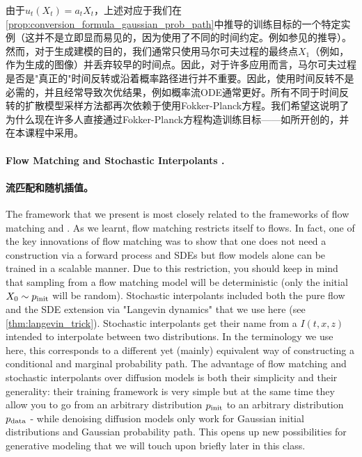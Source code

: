 由于$u_t(X_t)=a_tX_t$，上述对应于我们在\cref{prop:conversion_formula_gaussian_prob_path}中推导的训练目标的一个特定实例（这并不是立即显而易见的，因为使用了不同的时间约定。例如参见\citep{lipman2024flow}的推导）。然而，对于生成建模的目的，我们通常只使用马尔可夫过程的最终点$X_1$（例如，作为生成的图像）并丢弃较早的时间点。因此，对于许多应用而言，马尔可夫过程是否是"真正的"时间反转或沿着概率路径进行并不重要。因此，使用时间反转不是必需的，并且经常导致次优结果，例如概率流ODE通常更好\citep{karras2022elucidating, ma2024sit}。所有不同于时间反转的扩散模型采样方法都再次依赖于使用Fokker-Planck方程。我们希望这说明了为什么现在许多人直接通过Fokker-Planck方程构造训练目标——如\citep{lipman2022flow,liu2022flow,albergo2023stochastic}所开创的，并在本课程中采用。

\paragraph{Flow Matching \citep{lipman2022flow} and Stochastic Interpolants \citep{albergo2023stochastic}.}

\paragraph{流匹配\citep{lipman2022flow}和随机插值\citep{albergo2023stochastic}。}

The framework that we present is most closely related to the frameworks of flow matching and . As we learnt, flow matching restricts itself to flows. In fact, one of the key innovations of flow matching was to show that one does not need a construction via a forward process and SDEs but flow models alone can be trained in a scalable manner. Due to this restriction, you should keep in mind that sampling from a flow matching model will be  deterministic (only the initial $X_0\sim p_{\rm{init}}$ will be random). Stochastic interpolants included both the pure flow and the SDE extension via "Langevin dynamics" that we use here (see \cref{thm:langevin_trick}). Stochastic interpolants get their name from a  $I(t,x,z)$ intended to interpolate between two distributions. In the terminology we use here, this corresponds to a different yet (mainly) equivalent way of constructing a conditional and marginal probability path. The advantage of flow matching and stochastic interpolants over diffusion models is both their simplicity and their generality: their training framework is very simple but at the same time they allow you to go from an arbitrary distribution $p_{\rm{init}}$ to an arbitrary distribution $p_{\rm{data}}$ - while denoising diffusion models only work for Gaussian initial distributions and  Gaussian probability path. This opens up new possibilities for generative modeling that we will touch upon briefly later in this class.

